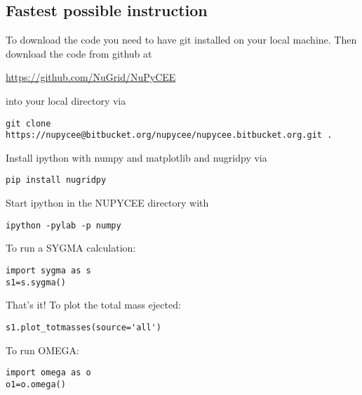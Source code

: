 
\subsection{Fastest possible instruction}

To download the code
you need to have git installed on your local machine.
Then download the code from github at

\url{https://github.com/NuGrid/NuPyCEE}

into your local directory via

\begin{verbatim}
git clone https://nupycee@bitbucket.org/nupycee/nupycee.bitbucket.org.git .
\end{verbatim}

Install ipython with numpy and matplotlib and
nugridpy via

\begin{verbatim}
pip install nugridpy
\end{verbatim}

Start ipython in the NUPYCEE directory with

\begin{verbatim}
ipython -pylab -p numpy
\end{verbatim}

To run a SYGMA calculation:

\begin{verbatim}
import sygma as s
s1=s.sygma()
\end{verbatim}

That's it! To plot the total  mass ejected:

\begin{verbatim}
s1.plot_totmasses(source='all')	
\end{verbatim}


To run OMEGA:

\begin{verbatim}
import omega as o
o1=o.omega()
\end{verbatim}

